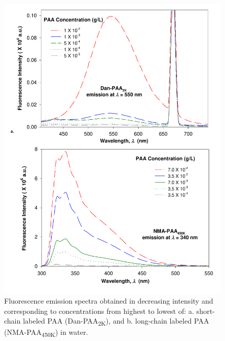 \documentclass[journal=mamobx,manuscript=article]{achemso}
\begin{document}
\begin{figure}[H]
\includegraphics[scale=0.65]{Presentation12.pdf}
\caption{Fluorescence emission spectra obtained in
decreasing intensity and corresponding to concentrations from highest to lowest of: a. short-chain labeled PAA (Dan-PAA\textsubscript{2K}), and b. long-chain labeled PAA (NMA-PAA\textsubscript{450K}) in water.}
\label{figure 2}
\end{figure}
 
\end{document}
